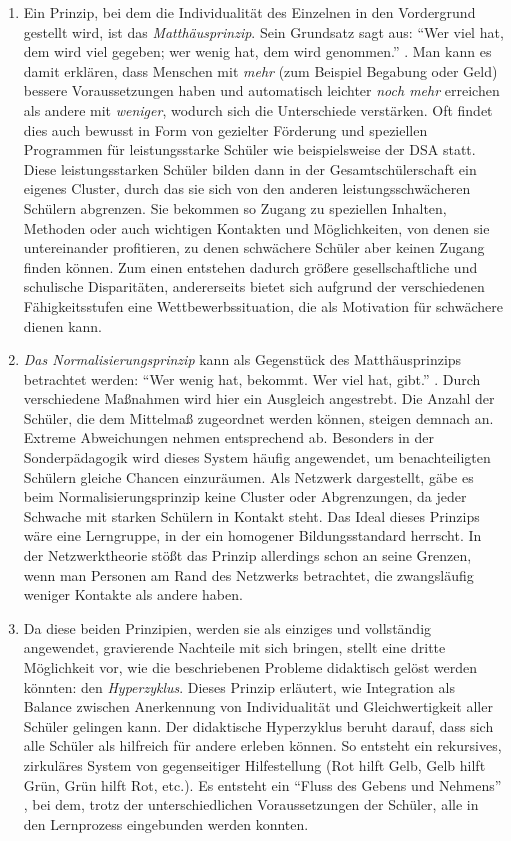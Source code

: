 \begin{enumerate}
	\item Ein Prinzip, bei dem die Individualität des Einzelnen in den Vordergrund gestellt wird, ist das \emph{Matthäusprinzip}.
	Sein Grundsatz sagt aus: ``Wer viel hat, dem wird viel gegeben; wer wenig hat, dem wird genommen.'' \parencite[105]{Zimpel2012}.
	Man kann es damit erklären, dass Menschen mit \emph{mehr} (zum Beispiel Begabung oder Geld) bessere Voraussetzungen haben und automatisch leichter \emph{noch mehr} erreichen als andere mit  \emph{weniger}, wodurch sich die Unterschiede verstärken.
	Oft findet dies auch bewusst in Form von gezielter Förderung und speziellen Programmen für leistungsstarke Schüler wie beispielsweise der DSA statt.
	Diese leistungsstarken Schüler bilden dann in der Gesamtschülerschaft ein eigenes Cluster, durch das sie sich von den anderen leistungsschwächeren Schülern abgrenzen.
	Sie bekommen so Zugang zu speziellen Inhalten, Methoden oder auch wichtigen Kontakten und Möglichkeiten, von denen sie untereinander profitieren, zu denen schwächere Schüler aber keinen Zugang finden können.
	Zum einen entstehen dadurch größere gesellschaftliche und schulische Disparitäten, andererseits bietet sich aufgrund der verschiedenen Fähigkeitsstufen eine Wettbewerbssituation, die als Motivation für schwächere dienen kann.

	\item \emph{Das Normalisierungsprinzip} kann als Gegenstück des Matthäusprinzips betrachtet werden: ``Wer wenig hat, bekommt. Wer viel hat, gibt.'' \parencite[12]{Zimpel2012}.
	Durch verschiedene Maßnahmen wird hier ein Ausgleich angestrebt.
	Die Anzahl der Schüler, die dem Mittelmaß zugeordnet werden können, steigen demnach an.
	Extreme Abweichungen nehmen entsprechend ab.
	Besonders in der Sonderpädagogik wird dieses System häufig angewendet, um benachteiligten Schülern gleiche Chancen einzuräumen.
	Als Netzwerk dargestellt, gäbe es beim Normalisierungsprinzip keine Cluster oder Abgrenzungen, da jeder Schwache mit starken Schülern in Kontakt steht.
	Das Ideal dieses Prinzips wäre eine Lerngruppe, in der ein homogener Bildungsstandard herrscht.
	In der Netzwerktheorie stößt das Prinzip allerdings schon an seine Grenzen, wenn man Personen am Rand des Netzwerks betrachtet, die zwangsläufig weniger Kontakte als andere haben.

	\item Da diese beiden Prinzipien, werden sie als einziges und vollständig angewendet, gravierende Nachteile mit sich bringen, stellt \citeauthor{Zimpel2012} eine dritte Möglichkeit vor, wie die beschriebenen Probleme didaktisch gelöst werden könnten: den \emph{Hyperzyklus}.
	Dieses Prinzip erläutert, wie Integration als Balance zwischen Anerkennung von Individualität und Gleichwertigkeit aller Schüler gelingen kann.
	Der didaktische Hyperzyklus beruht darauf, dass sich alle Schüler als hilfreich für andere erleben können.
	So entsteht ein rekursives, zirkuläres System von gegenseitiger Hilfestellung (Rot hilft Gelb, Gelb hilft Grün, Grün hilft Rot, etc.).
	Es entsteht ein ``Fluss des Gebens und Nehmens'' \parencite[125]{Zimpel2012}, bei dem, trotz der unterschiedlichen Voraussetzungen der Schüler, alle in den Lernprozess eingebunden werden konnten.


\end{enumerate}
